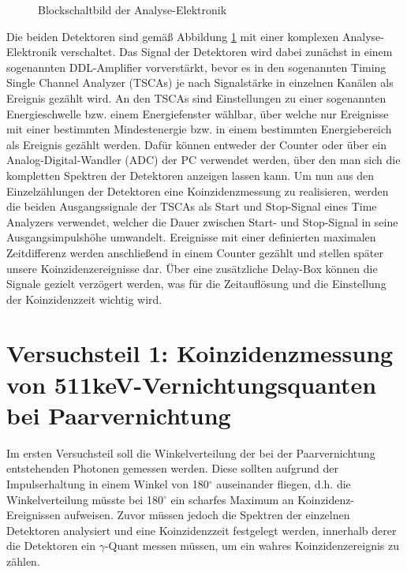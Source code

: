 \documentclass[11pt]{scrartcl}
\begin{document}
\begin{figure}[htbp]  
     
  \caption{Blockschaltbild der Analyse-Elektronik}
  \label{PMT3}
\end{figure}

Die beiden Detektoren sind gemäß Abbildung \ref{PMT3} mit einer komplexen Analyse-Elektronik verschaltet. Das Signal der Detektoren wird dabei zunächst in einem sogenannten DDL-Amplifier vorverstärkt, bevor es in den sogenannten Timing Single Channel Analyzer (TSCAs) je nach Signalstärke in einzelnen Kanälen als Ereignis gezählt wird. An den TSCAs sind Einstellungen zu einer sogenannten Energieschwelle bzw. einem Energiefenster wählbar, über welche nur Ereignisse mit einer bestimmten Mindestenergie bzw. in einem bestimmten Energiebereich als Ereignis gezählt werden. Dafür können entweder der Counter oder über ein Analog-Digital-Wandler (ADC) der PC verwendet werden, über den man sich die kompletten Spektren der Detektoren anzeigen lassen kann. Um nun aus den Einzelzählungen der Detektoren eine Koinzidenzmessung zu realisieren, werden die beiden Ausgangssignale der TSCAs als Start und Stop-Signal eines Time Analyzers verwendet, welcher die Dauer zwischen Start- und Stop-Signal in seine Ausgangsimpulshöhe umwandelt. Ereignisse mit einer definierten maximalen Zeitdifferenz werden anschließend in einem Counter gezählt und stellen später unsere Koinzidenzereignisse dar. Über eine zusätzliche Delay-Box können die Signale gezielt verzögert werden, was für die Zeitauflösung und die Einstellung der Koinzidenzzeit wichtig wird. 

\section{Versuchsteil 1: Koinzidenzmessung von 511keV-Vernichtungsquanten bei Paarvernichtung}
Im ersten Versuchsteil soll die Winkelverteilung der bei der Paarvernichtung entstehenden Photonen gemessen werden. Diese sollten aufgrund der Impulserhaltung in einem Winkel von 180$^\circ$ auseinander fliegen, d.h. die Winkelverteilung müsste bei 180$^\circ$ ein scharfes Maximum an Koinzidenz-Ereignissen aufweisen. Zuvor müssen jedoch die Spektren der einzelnen Detektoren analysiert und eine Koinzidenzzeit festgelegt werden, innerhalb derer die Detektoren ein $\gamma$-Quant messen müssen, um ein wahres Koinzidenzereignis zu zählen. 
\end{document}
